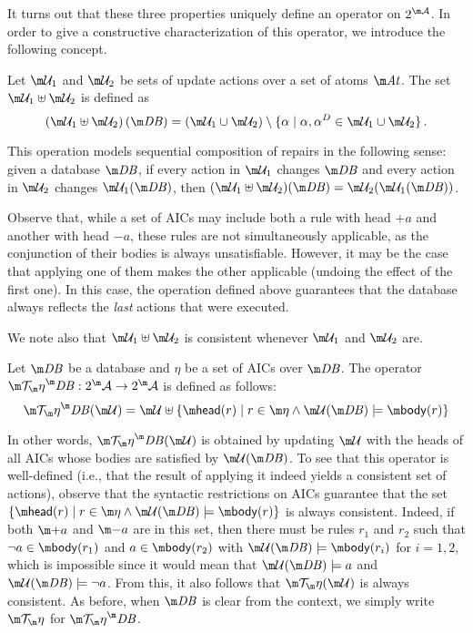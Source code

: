 It turns out that these three properties uniquely define an operator on $2^{\acts}$. 
In order to give a constructive characterization of this operator, we introduce the following concept. 


\begin{definition}
  Let $\UU_1$ and $\UU_2$ be sets of update actions over a set of atoms $\atoms$.
  The set $\UU_1\uplus\UU_2$ is defined as
  \[\left(\UU_1\uplus \UU_2\right)(\db) = \left(\UU_1\cup \UU_2\right) \setminus \{\alpha \mid \alpha,\alpha^D\in \UU_1\cup\UU_2\}\,.\]
\end{definition}
This operation models sequential composition of repairs in the following sense: given a database $\db$, if every action in $\UU_1$ changes $\db$ and every action in $\UU_2$ changes $\UU_1(\db)$, then $(\UU_1\uplus\UU_2)(\db)=\UU_2(\UU_1(\db))$.

Observe that, while a set of AICs may include both a rule with head $+a$ and another with head $-a$, these rules are not simultaneously applicable, as the conjunction of their bodies is always unsatisfiable.
However, it may be the case that applying one of them makes the other applicable (undoing the effect of the first one).
In this case, the operation defined above guarantees that the database always reflects the \emph{last} actions that were executed.

We note also that $\UU_1\uplus\UU_2$ is consistent whenever $\UU_1$ and $\UU_2$ are.
%
\begin{definition}
  Let $\db$ be a database and $\eta$ be a set of AICs over $\db$.
  The operator $\Op^\db:2^\acts\to 2^\acts$ is defined as follows:
  \[
    \Op^\db(\UU) = \UU\uplus\{\head(r)\mid r\in \aics \land \UU(\db)\models\body(r)\}
  \]
\end{definition}
In other words, $\Op^\db(\UU)$ is obtained by updating $\UU$ with the heads of all AICs whose bodies are satisfied by $\UU(\db)$.
To see that this operator is well-defined (i.e., that the result of applying it indeed yields a consistent set of actions), observe that the syntactic restrictions on AICs guarantee that the set $\{\head(r)\mid r\in \aics \land \UU(\db)\models\body(r)\}$ is always consistent. 
 Indeed, if both $\add a$ and $\remove a$ are in this set, then there must be rules $r_1$ and $r_2$ such that $\neg a\in\body(r_1)$ and $a\in\body(r_2)$ with $\UU(\db)\models\body(r_i)$ for $i=1,2$, which is impossible since it would mean that $\UU(\db)\models a$ and $\UU(\db)\models \lnot a$.
 From this, it also follows that $\Op(\UU)$ is always consistent. 
As before, when $\db$ is clear from the context, we simply write $\Op$ for $\Op^\db$.


